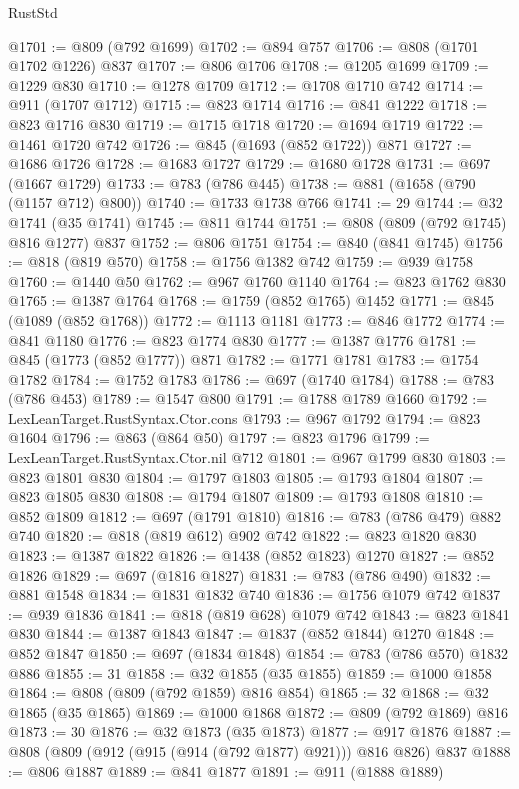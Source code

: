 \begin{lexlean}{RustStd}
\begin{coremodule}
@1701 := @809 (@792 @1699)
@1702 := @894 @757
@1706 := @808 (@1701 @1702 @1226) @837
@1707 := @806 @1706
@1708 := @1205 @1699
@1709 := @1229 @830
@1710 := @1278 @1709
@1712 := @1708 @1710 @742
@1714 := @911 (@1707 @1712)
@1715 := @823 @1714
@1716 := @841 @1222
@1718 := @823 @1716 @830
@1719 := @1715 @1718
@1720 := @1694 @1719
@1722 := @1461 @1720 @742
@1726 := @845 (@1693 (@852 @1722)) @871
@1727 := @1686 @1726
@1728 := @1683 @1727
@1729 := @1680 @1728
@1731 := @697 (@1667 @1729)
@1733 := @783 (@786 @445)
@1738 := @881 (@1658 (@790 (@1157 @712) @800))
@1740 := @1733 @1738 @766
@1741 := 29
@1744 := @32 @1741 (@35 @1741)
@1745 := @811 @1744
@1751 := @808 (@809 (@792 @1745) @816 @1277) @837
@1752 := @806 @1751
@1754 := @840 (@841 @1745)
@1756 := @818 (@819 @570)
@1758 := @1756 @1382 @742
@1759 := @939 @1758
@1760 := @1440 @50
@1762 := @967 @1760 @1140
@1764 := @823 @1762 @830
@1765 := @1387 @1764
@1768 := @1759 (@852 @1765) @1452
@1771 := @845 (@1089 (@852 @1768))
@1772 := @1113 @1181
@1773 := @846 @1772
@1774 := @841 @1180
@1776 := @823 @1774 @830
@1777 := @1387 @1776
@1781 := @845 (@1773 (@852 @1777)) @871
@1782 := @1771 @1781
@1783 := @1754 @1782
@1784 := @1752 @1783
@1786 := @697 (@1740 @1784)
@1788 := @783 (@786 @453)
@1789 := @1547 @800
@1791 := @1788 @1789 @1660
@1792 := LexLeanTarget.RustSyntax.Ctor.cons
@1793 := @967 @1792
@1794 := @823 @1604
@1796 := @863 (@864 @50)
@1797 := @823 @1796
@1799 := LexLeanTarget.RustSyntax.Ctor.nil @712
@1801 := @967 @1799 @830
@1803 := @823 @1801 @830
@1804 := @1797 @1803
@1805 := @1793 @1804
@1807 := @823 @1805 @830
@1808 := @1794 @1807
@1809 := @1793 @1808
@1810 := @852 @1809
@1812 := @697 (@1791 @1810)
@1816 := @783 (@786 @479) @882 @740
@1820 := @818 (@819 @612) @902 @742
@1822 := @823 @1820 @830
@1823 := @1387 @1822
@1826 := @1438 (@852 @1823) @1270
@1827 := @852 @1826
@1829 := @697 (@1816 @1827)
@1831 := @783 (@786 @490)
@1832 := @881 @1548
@1834 := @1831 @1832 @740
@1836 := @1756 @1079 @742
@1837 := @939 @1836
@1841 := @818 (@819 @628) @1079 @742
@1843 := @823 @1841 @830
@1844 := @1387 @1843
@1847 := @1837 (@852 @1844) @1270
@1848 := @852 @1847
@1850 := @697 (@1834 @1848)
@1854 := @783 (@786 @570) @1832 @886
@1855 := 31
@1858 := @32 @1855 (@35 @1855)
@1859 := @1000 @1858
@1864 := @808 (@809 (@792 @1859) @816 @854)
@1865 := 32
@1868 := @32 @1865 (@35 @1865)
@1869 := @1000 @1868
@1872 := @809 (@792 @1869) @816
@1873 := 30
@1876 := @32 @1873 (@35 @1873)
@1877 := @917 @1876
@1887 := @808 (@809 (@912 (@915 (@914 (@792 @1877) @921))) @816 @826) @837
@1888 := @806 @1887
@1889 := @841 @1877
@1891 := @911 (@1888 @1889)

\end{coremodule}
\end{lexlean}
